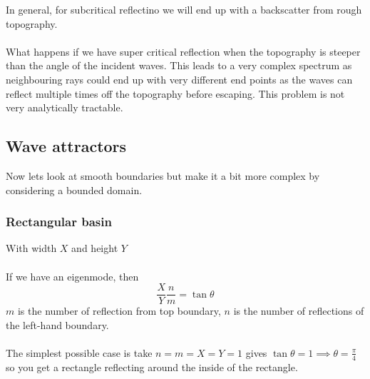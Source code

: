 \documentclass{article}
\begin{document}
In general, for subcritical reflectino we will end up with a backscatter from rough topography.\\\\
What happens if we have super critical reflection when the topography is steeper than the angle of the incident waves. This leads to a very complex spectrum as neighbouring rays could end up with very different end points as the waves can reflect multiple times off the topography before escaping. This problem is not very analytically tractable.
\subsection{Wave attractors}
Now lets look at smooth boundaries but make it a bit more complex by considering a bounded domain.
\subsubsection{Rectangular basin}
With width $X$ and height $Y$\\\\
If we have an eigenmode, then
$$
\frac{X}{Y} \frac{n}{m} = \tan \theta
$$
$m$ is the number of reflection from top boundary, $n$ is the number of reflections of the left-hand boundary.\\\\
The simplest possible case is take $n=m=X=Y=1$ gives $\tan \theta = 1 \implies \theta = \frac{\pi}{4}$ so you get a rectangle reflecting around the inside of the rectangle.
\end{document}
